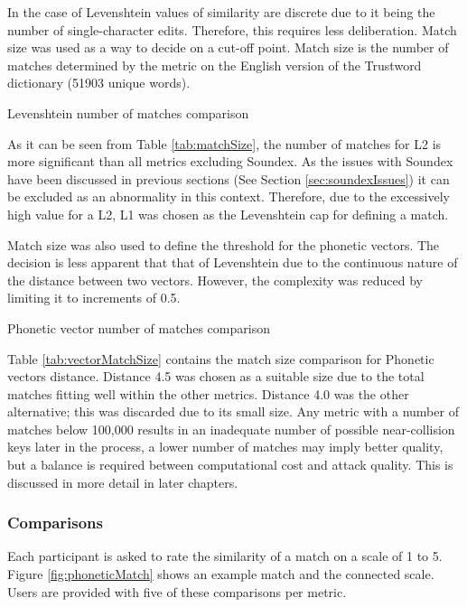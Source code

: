 In the case of Levenshtein values of similarity are discrete due to it being the number of single-character edits. Therefore, this requires less deliberation. Match size was used as a way to decide on a cut-off point. Match size is the number of matches determined by the metric on the English version of the Trustword dictionary (51903 unique words).

\begin{table}[h!]
    \centering
    
    \caption{Levenshtein number of matches comparison}
    \label{tab:matchSize}
\end{table}

As it can be seen from Table \ref{tab:matchSize}, the number of matches for L2 is more significant than all metrics excluding Soundex. As the issues with Soundex have been discussed in previous sections (See Section \ref{sec:soundexIssues}) it can be excluded as an abnormality in this context. Therefore, due to the excessively high value for a L2, L1 was chosen as the Levenshtein cap for defining a match.

Match size was also used to define the threshold for the phonetic vectors. The decision is less apparent that that of Levenshtein due to the continuous nature of the distance between two vectors. However, the complexity was reduced by limiting it to increments of 0.5.

\begin{table}[h!]
    \centering
    
    \caption{Phonetic vector number of matches comparison}
    \label{tab:vectorMatchSize}
\end{table}

Table \ref{tab:vectorMatchSize} contains the match size comparison for Phonetic vectors distance. Distance 4.5 was chosen as a suitable size due to the total matches fitting well within the other metrics. Distance 4.0 was the other alternative; this was discarded due to its small size. Any metric with a number of matches below 100,000 results in an inadequate number of possible near-collision keys later in the process, a lower number of matches may imply better quality, but a balance is required between computational cost and attack quality. This is discussed in more detail in later chapters.


\subsubsection{Comparisons}
Each participant is asked to rate the similarity of a match on a scale of 1 to 5. Figure \ref{fig:phoneticMatch} shows an example match and the connected scale. Users are provided with five of these comparisons per metric.

